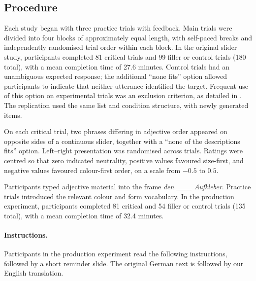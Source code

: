 \documentclass[10pt,a4paper,fleqn]{article}
\begin{document}
\subsection{Procedure}

Each study began with three practice trials with feedback.
Main trials were divided into four blocks of approximately equal length, with self-paced breaks and independently randomised trial order within each block.
In the original slider study, participants completed 81 critical trials and 99 filler or control trials (180 total), with a mean completion time of 27.6 minutes.
Control trials had an unambiguous expected response; the additional ``none fits'' option allowed participants to indicate that neither utterance identified the target.
Frequent use of this option on experimental trials was an exclusion criterion, as detailed in .
The replication used the same list and condition structure, with newly generated items.

On each critical trial, two phrases differing in adjective order appeared on opposite sides of a continuous slider, together with a ``none of the descriptions fits'' option.
Left--right presentation was randomised across trials.
Ratings were centred so that zero indicated neutrality, positive values favoured size-first, and negative values favoured colour-first order, on a scale from $-0.5$ to $0.5$.

Participants typed adjective material into the frame \emph{den \_\_\_ Aufkleber}.
Practice trials introduced the relevant colour and form vocabulary.
In the production experiment, participants completed 81 critical and 54 filler or control trials (135 total), with a mean completion time of 32.4 minutes.

\paragraph{Instructions.}
\label{sec:appendix:instructions}
Participants in the production experiment read the following instructions, followed by a short reminder slide.
The original German text is followed by our English translation.
\end{document}

